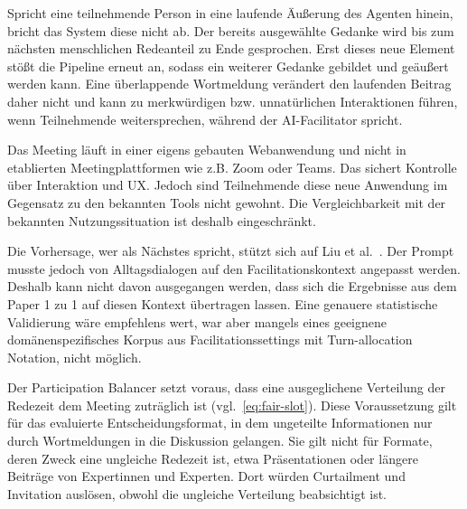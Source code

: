 Spricht eine teilnehmende Person in eine laufende Äußerung des Agenten hinein, bricht das System
diese nicht ab.
Der bereits ausgewählte Gedanke wird bis zum nächsten menschlichen Redeanteil zu Ende gesprochen.
Erst dieses neue Element stößt die Pipeline erneut an, sodass ein weiterer Gedanke gebildet und
geäußert werden kann.
Eine überlappende Wortmeldung verändert den laufenden Beitrag daher nicht und kann zu merkwürdigen bzw.
unnatürlichen Interaktionen führen, wenn Teilnehmende weitersprechen, während der AI-Facilitator spricht.

Das Meeting läuft in einer eigens gebauten Webanwendung und nicht in etablierten Meetingplattformen wie z.B.
Zoom oder Teams. Das sichert Kontrolle über Interaktion und UX. Jedoch sind Teilnehmende diese neue
Anwendung im Gegensatz zu den bekannten Tools nicht gewohnt.
Die Vergleichbarkeit mit der bekannten Nutzungssituation ist deshalb eingeschränkt.

Die Vorhersage, wer als Nächstes spricht, stützt sich auf Liu et al.\
\cite{liuProactiveConversationalAgents2025}.
Der Prompt musste jedoch von Alltagsdialogen auf den Facilitationskontext angepasst werden.
Deshalb kann nicht davon ausgegangen werden, dass sich die Ergebnisse aus dem Paper 1 zu 1 auf diesen Kontext
übertragen lassen.
Eine genauere statistische Validierung wäre empfehlens wert, war aber mangels eines geeignene
domänenspezifisches Korpus aus Facilitationssettings mit Turn-allocation Notation, nicht möglich.

Der Participation Balancer setzt voraus, dass eine ausgeglichene Verteilung der Redezeit dem
Meeting zuträglich ist (vgl.\ \eqref{eq:fair-slot}).
Diese Voraussetzung gilt für das evaluierte Entscheidungsformat, in dem ungeteilte Informationen
nur durch Wortmeldungen in die Diskussion gelangen.
Sie gilt nicht für Formate, deren Zweck eine ungleiche Redezeit ist, etwa Präsentationen oder
längere Beiträge von Expertinnen und Experten.
Dort würden Curtailment und Invitation auslösen, obwohl die ungleiche Verteilung beabsichtigt ist.
